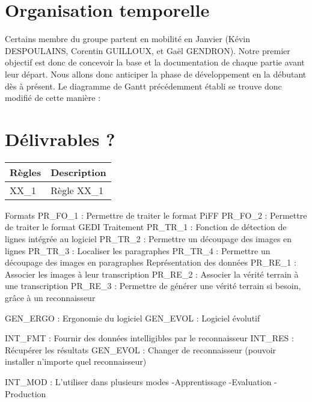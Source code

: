 \section{Organisation temporelle}

Certains membre du groupe partent en mobilité en Janvier (Kévin DESPOULAINS,
Corentin GUILLOUX, et Gaël GENDRON). Notre premier objectif est donc de
concevoir la base et la documentation de chaque partie avant leur départ.
Nous allons donc anticiper la phase de développement en la débutant dès à
présent. Le diagramme de Gantt précédemment établi se trouve donc modifié de
cette manière :

\paragraph{}
\begin{mdframed}[frametitle={Gantt + légende}, innerbottommargin=10]
\begin{center}
\end{center}
\end{mdframed}

\section{Délivrables ?}

\begin{mdframed}[frametitle={Figure N : LOT 1 - X}, innerbottommargin=10]
\begin{center}
\begin{tabular}{ | l | l | }
\hline
{\textbf{Règles}}   &   {\textbf{Description}} \\ \hline
{XX\_1}              &   {Règle XX\_1} \\ \hline
\end{tabular}
\end{center}
\end{mdframed}

Formats
PR\_FO\_1 : Permettre de traiter le format PiFF
PR\_FO\_2 : Permettre de traiter le format GEDI
Traitement
PR\_TR\_1 : Fonction de détection de lignes intégrée au logiciel
PR\_TR\_2 : Permettre un découpage des images en lignes
PR\_TR\_3 : Localiser les paragraphes
PR\_TR\_4 : Permettre un découpage des images en paragraphes
Représentation des données
PR\_RE\_1 : Associer les images à leur transcription
PR\_RE\_2 : Associer la vérité terrain à une transcription
PR\_RE\_3 : Permettre de générer une vérité terrain si besoin, grâce à un reconnaisseur

GEN\_ERGO : Ergonomie du logiciel
GEN\_EVOL : Logiciel évolutif

INT\_FMT : Fournir des données intelligibles par le reconnaisseur
INT\_RES : Récupérer les résultats
GEN\_EVOL : Changer de reconnaisseur (pouvoir installer n’importe quel reconnaisseur)

INT\_MOD : L’utiliser dans plusieurs modes
-Apprentissage
-Evaluation
-Production